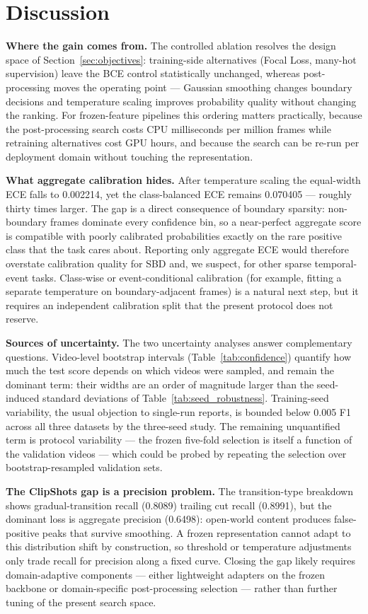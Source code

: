 \section{Discussion}
\label{sec:discussion}

\textbf{Where the gain comes from.} The controlled ablation resolves the
design space of Section~\ref{sec:objectives}: training-side alternatives
(Focal Loss, many-hot supervision) leave the BCE control statistically
unchanged, whereas post-processing moves the operating point --- Gaussian
smoothing changes boundary decisions and temperature scaling improves
probability quality without changing the ranking. For frozen-feature pipelines this ordering matters
practically, because the post-processing search costs CPU milliseconds per
million frames while retraining alternatives cost GPU hours, and because the
search can be re-run per deployment domain without touching the
representation.

\textbf{What aggregate calibration hides.} After temperature scaling the
equal-width ECE falls to 0.002214, yet the class-balanced ECE remains
0.070405 --- roughly thirty times larger. The gap is a direct consequence of
boundary sparsity: non-boundary frames dominate every confidence bin, so a
near-perfect aggregate score is compatible with poorly calibrated
probabilities exactly on the rare positive class that the task cares about.
Reporting only aggregate ECE would therefore overstate calibration quality
for SBD and, we suspect, for other sparse temporal-event tasks. Class-wise
or event-conditional calibration (for example, fitting a separate temperature
on boundary-adjacent frames) is a natural next step, but it requires an
independent calibration split that the present protocol does not reserve.

\textbf{Sources of uncertainty.} The two uncertainty analyses answer
complementary questions. Video-level bootstrap intervals
(Table~\ref{tab:confidence}) quantify how much the test score depends on
which videos were sampled, and remain the dominant term: their widths are an
order of magnitude larger than the seed-induced standard deviations of
Table~\ref{tab:seed_robustness}. Training-seed variability, the usual
objection to single-run reports, is bounded below 0.005 F1 across all three
datasets by the three-seed study. The remaining unquantified term is protocol
variability --- the frozen five-fold selection is itself a function of the
validation videos --- which could be probed by repeating the selection over
bootstrap-resampled validation sets.

\textbf{The ClipShots gap is a precision problem.} The transition-type
breakdown shows gradual-transition recall (0.8089) trailing cut recall
(0.8991), but the dominant loss is aggregate precision (0.6498): open-world
content produces false-positive peaks that survive smoothing. A frozen
representation cannot adapt to this distribution shift by construction, so
threshold or temperature adjustments only trade recall for precision along a
fixed curve. Closing the gap likely requires domain-adaptive components ---
either lightweight adapters on the frozen backbone or domain-specific
post-processing selection --- rather than further tuning of the present
search space.
